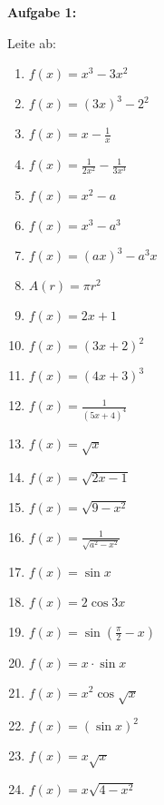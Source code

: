 \documentclass[a4paper,12pt]{article}
\newcommand{\Aufgabe}[1]{
  {
  \vspace*{0.5cm}
  \textsf{\textbf{Aufgabe #1}}
  \vspace*{0.2cm}
  
  }
}
\begin{document}
\Aufgabe{1:}
Leite ab:
\begin{enumerate}[label={\alph*)}, topsep=5pt,itemsep=4ex,partopsep=1ex,parsep=1ex]
  \item $f(x)=x^3-3x^2$
  \item $f(x)=(3x)^3-2^2$
  \item $f(x)=x-\frac{1}{x}$
  \item $f(x)=\frac{1}{2x^2}-\frac{1}{3x^3}$
  \item $f(x)=x^2-a$
  \item $f(x)=x^3-a^3$
  \item $f(x)=(ax)^3-a^3x$
  \item $A(r)=\pi r^2$
  \item $f(x)=2x+1$
  \item $f(x)=(3x+2)^2$
  \item $f(x)=(4x+3)^3$
  \item $f(x)=\frac{1}{(5x+4)^4}$
  \item $f(x)=\sqrt{x}$
  \item $f(x)=\sqrt{2x-1}$
  \item $f(x)=\sqrt{9-x^2}$
  \item $f(x)=\frac{1}{\sqrt{a^2-x^2}}$
  \item $f(x)=\sin{x}$
  \item $f(x)=2 \cos{3x}$
  \item $f(x)=\sin{(\frac{\pi}{2}-x)}$
  \item $f(x)=x\cdot \sin{x}$
  \item $f(x)=x^2 \cos{\sqrt{x}}$
  \item $f(x)=(\sin{x})^2$
  \item $f(x)=x\sqrt{x}$
  \item $f(x)=x\sqrt{4-x^2}$
\end{enumerate}

\vspace{1cm}
\end{document}
